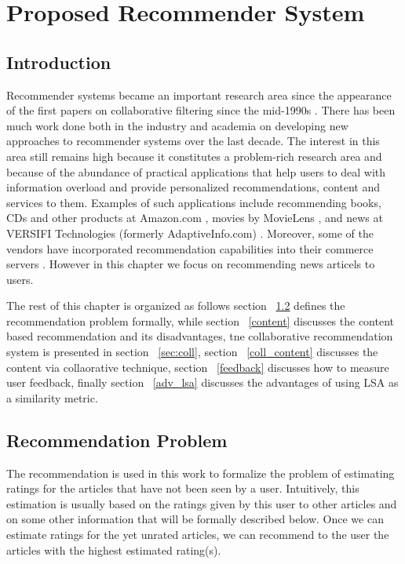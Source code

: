 
\chapter{Proposed Recommender System} %

\label{recommender} %



\section{Introduction}
Recommender systems became an important research area since the appearance of the first papers on collaborative filtering since the mid-1990s  \citep{recom_45} \citep{recom_86} \citep{recom_97}. There has been much work done both in the industry and academia on developing new approaches to recommender systems over the last decade. The interest in this area still remains high because it constitutes a problem-rich research area and because of the abundance of practical applications that help users to deal with information overload and provide personalized recommendations, content and services to them. Examples of such applications include recommending books, CDs and other products at Amazon.com \citep{recom_61}, movies by MovieLens \citep{recom_67}, and news at VERSIFI Technologies (formerly AdaptiveInfo.com) \citep{recom_14}. Moreover, some of the vendors have incorporated recommendation capabilities into their commerce servers \citep{recom_78}. However in this chapter we focus on recommending news articels to users.

The rest of this chapter is organized as follows section ~\ref{problem} defines the recommendation problem formally,  while section ~\ref{content} discusses the content based recommendation and its disadvantages, tne collaborative recommendation system is presented in section ~\ref{sec:coll}, section ~\ref{coll_content} discusses the content via collaorative technique, section ~\ref{feedback} discusses how to measure user feedback, finally section ~\ref{adv_lsa} discusses the advantages of using LSA as a similarity metric.


\section{Recommendation Problem}\label{problem}
The recommendation is used in this work to formalize the problem of estimating ratings for the articles that have not been seen by a user. Intuitively, this estimation is usually based on the ratings given by this user to other articles and on some other information that will be formally described below. Once we can estimate ratings for the yet unrated articles, we can recommend to the user the articles with the highest estimated rating(s).

